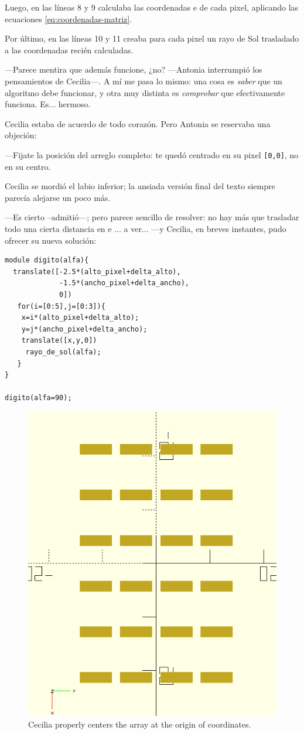     Luego, en las líneas 8 y 9 calculaba las coordenadas  e
     de cada pixel, aplicando las ecuaciones
    \ref{eq:coordenadas-matriz}.

    Por último, en las líneas 10 y 11 creaba para cada pixel un rayo
    de Sol trasladado a las coordenadas recién calculadas.

    ---Parece mentira que además funcione, ¿no? ---Antonia interrumpió
    los pensamientos de Cecilia---. A mí me pasa lo mismo: una cosa es
    \emph{saber} que un algoritmo debe funcionar, y otra muy distinta
    es \emph{comprobar} que efectivamente funciona. Es... hermoso.

    Cecilia estaba de acuerdo de todo corazón. Pero Antonia se
    reservaba una objeción:

    ---Fijate la posición del arreglo completo: te quedó centrado en
    su pixel \texttt{[0,0]}, no en su centro.
    
    Cecilia se mordió el labio inferior; la ansiada versión final del
    texto siempre parecía alejarse un poco más.

    ---Es cierto --admitió---; pero parece sencillo de resolver: no
    hay más que trasladar todo una cierta distancia en  e
    ... a ver... ---y Cecilia, en breves instantes, pudo
    ofrecer su nueva solución:

    \begin{lstlisting}
module digito(alfa){
  translate([-2.5*(alto_pixel+delta_alto),
             -1.5*(ancho_pixel+delta_ancho),
             0])
   for(i=[0:5],j=[0:3]){
    x=i*(alto_pixel+delta_alto);
    y=j*(ancho_pixel+delta_ancho);
    translate([x,y,0])
     rayo_de_sol(alfa);
   } 
}

digito(alfa=90);
    \end{lstlisting}

  
  \begin{figure}[ht]
    \centering
    \includegraphics[width=.45\textwidth]{imagenes/matriz-completa-centrada-0}    
    \caption{Cecilia properly centers the array at the origin of coordinates.}
    \label{fig:matriz-completa-centrada-0}
  \end{figure}
  



